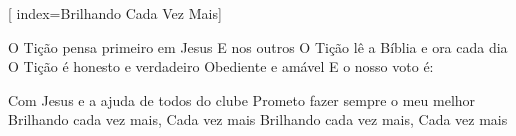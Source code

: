 %

\setcounter{songnum}{141}

[
        index={Brilhando Cada Vez Mais}]

\beginverse
O Tição pensa primeiro em Jesus
E nos outros
O Tição lê a Bíblia e ora cada dia
O Tição é honesto e verdadeiro
Obediente e amável
E o nosso voto é:
\endverse

\beginchorus
Com Jesus e a ajuda de todos do clube
Prometo fazer sempre o meu melhor
Brilhando cada vez mais,
Cada vez mais
Brilhando cada vez mais,
Cada vez mais
\endchorus



\endsong

%